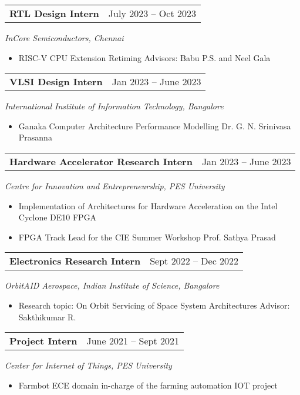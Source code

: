 \begin{tabular}{@{}p{4in}p{2in}}
  {\bf{RTL Design Intern}}  & July 2023 – Oct 2023 \\
\end{tabular}  
\textit{InCore Semiconductors, Chennai} 
\begin{itemize}
    \setlength\itemsep{0em}
  \item RISC-V CPU Extension Retiming 
    \subitem Advisors: Babu P.S. and Neel Gala  
\end{itemize}

\begin{tabular}{@{}p{4in}p{2in}}
  {\bf{VLSI Design Intern}} & Jan 2023 – June 2023 \\
\end{tabular}
\textit{International Institute of Information Technology, Bangalore}  
\begin{itemize}
    \setlength\itemsep{0em}
  \item Ganaka Computer Architecture Performance Modelling 
    \subitem Dr. G. N. Srinivasa Prasanna 
\end{itemize}

\begin{tabular}{@{}p{4in}p{2in}}
  {\bf{Hardware Accelerator Research Intern}}  & Jan 2023 – June 2023 \\
\end{tabular}
\textit{Centre for Innovation and Entrepreneurship, PES University} 
\begin{itemize}
    \setlength\itemsep{0em}
      \item Implementation of Architectures for Hardware Acceleration on the Intel
  Cyclone DE10 FPGA
      \item FPGA Track Lead for the CIE Summer Workshop
      \subitem Prof. Sathya Prasad 
\end{itemize}

\begin{tabular}{@{}p{4in}p{2in}}
  {\bf{Electronics Research Intern}} & Sept 2022 – Dec 2022 \\
\end{tabular}
\textit{OrbitAID Aerospace, Indian Institute of Science, Bangalore}  
\begin{itemize}
  \setlength\itemsep{0em}
  \item Research topic: On Orbit Servicing of Space System Architectures
  \subitem Advisor: Sakthikumar R.
\end{itemize}

\begin{tabular}{@{}p{4in}p{2in}}
  {\bf{Project Intern}} & June 2021 – Sept 2021 \\
\end{tabular}
\textit{Center for Internet of Things, PES University}  
\begin{itemize}
  \item Farmbot
  \subitem ECE domain in-charge of the farming automation IOT project
\end{itemize}
\endinput
